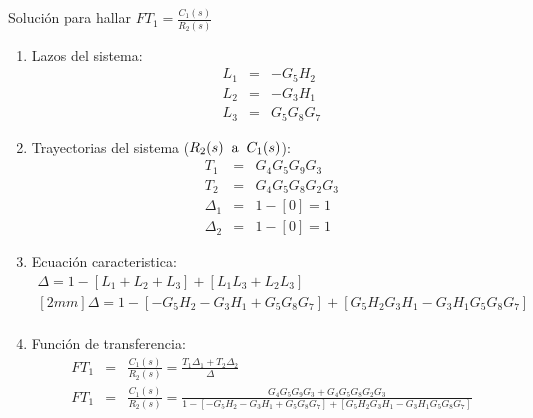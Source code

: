 \documentclass[12pt]{article}
\begin{document}
\begin{tikzpicture}


\end{tikzpicture}

\vspace{1cm}

Soluci\'on para hallar \( \displaystyle FT_{1}=\frac{C_{1}(s)}{R_{2}(s)} \)

\begin{enumerate}
  \item Lazos del sistema:
    \begin{eqnarray*}
      L_{1} &=& - G_{5}H_{2} \\
      L_{2} &=& - G_{3}H_{1} \\
      L_{3} &=& G_{5}G_{8}G_{7}
    \end{eqnarray*}
  \item Trayectorias del sistema ($R_{2}(s) \hspace{2mm} \text{a} \hspace{2mm} C_{1}(s)$):
    \begin{eqnarray*}
      T_{1} &=& G_{4}G_{5}G_{9}G_{3} \\
      T_{2} &=& G_{4}G_{5}G_{8}G_{2}G_{3} \\
      \Delta_{1} &=& 1-[0]=1 \\
      \Delta_{2} &=& 1-[0]=1
    \end{eqnarray*}
  \item Ecuaci\'on caracteristica:
    \begin{eqnarray*}
      \Delta = 1-[L_{1}+L_{2}+L_{3}]+[L_{1}L_{3}+L_{2}L_{3}] \\ [2mm]
      \Delta = 1-[-G_{5}H_{2}-G_{3}H_{1}+G_{5}G_{8}G_{7}]+[G_{5}H_{2}G_{3}H_{1}-G_{3}H_{1}G_{5}G_{8}G_{7}]\\
    \end{eqnarray*}
  \item Funci\'on de transferencia:
    \begin{eqnarray*}
      FT_{1} &=& \frac{C_{1}(s)}{R_{2}(s)}=\frac{T_{1}\Delta_{1}+T_{2}\Delta_{2}}{\Delta} \\[5mm]
      FT_{1} &=&\frac{C_{1}(s)}{R_{2}(s)} = \frac{G_{4}G_{5}G_{9}G_{3}+G_{4}G_{5}G_{8}G_{2}G_{3}}{1-[-G_{5}H_{2}-G_{3}H_{1}+G_{5}G_{8}G_{7}]+[G_{5}H_{2}G_{3}H_{1}-G_{3}H_{1}G_{5}G_{8}G_{7}]} \\
    \end{eqnarray*}
\end{enumerate}
\end{document}
